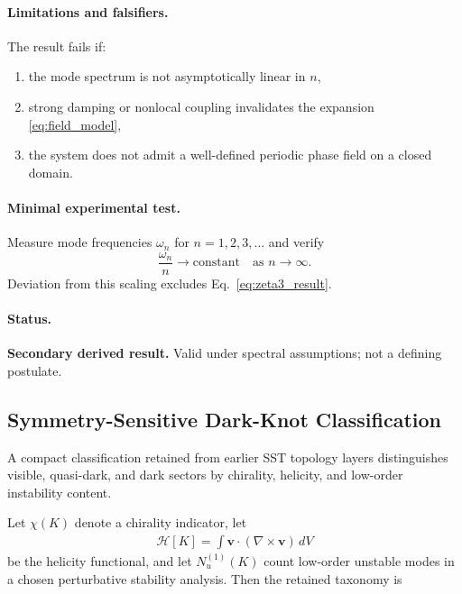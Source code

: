 \documentclass[11pt]{article}
\theoremstyle{definition}
\theoremstyle{plain}
\theoremstyle{remark}
\begin{document}
    \paragraph{Limitations and falsifiers.}
        The result fails if:
        \begin{enumerate}
            \item the mode spectrum is not asymptotically linear in $n$,
            \item strong damping or nonlocal coupling invalidates the expansion \eqref{eq:field_model},
            \item the system does not admit a well-defined periodic phase field on a closed domain.
        \end{enumerate}

    \paragraph{Minimal experimental test.}
        Measure mode frequencies $\omega_n$ for $n=1,2,3,\dots$ and verify
        \begin{equation}
            \frac{\omega_n}{n} \to \text{constant}
            \quad\text{as } n\to\infty.
        \end{equation}
        Deviation from this scaling excludes Eq.~\eqref{eq:zeta3_result}.

    \paragraph{Status.}
        \textbf{Secondary derived result.} Valid under spectral assumptions; not a defining postulate.

\subsection{Symmetry-Sensitive Dark-Knot Classification}
    \label{subsec:dark_knot_classification}

    A compact classification retained from earlier SST topology layers distinguishes visible, quasi-dark, and dark sectors by chirality, helicity, and low-order instability content.

    Let $\chi(K)$ denote a chirality indicator, let
    \begin{align}
        \mathcal{H}[K] = \int \mathbf{v}\cdot(\nabla\times\mathbf{v})\,dV
    \end{align}
    be the helicity functional, and let $N_u^{(1)}(K)$ count low-order unstable modes in a chosen perturbative stability analysis. Then the retained taxonomy is
\end{document}

